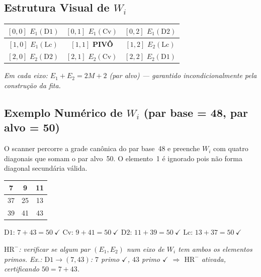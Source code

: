 \documentclass[12pt,a4paper]{article}
\theoremstyle{definition}
\newcommand{\HRm}{\mathrm{HR}^{-}}
\begin{document}
\subsection{Estrutura Visual de \texorpdfstring{$W_i$}{Wi}}
\label{subsec:janela-visual}

\renewcommand{\arraystretch}{1.6}
\begin{center}
\begin{tabular}{|c|c|c|}
	\hline
	$[0,0]$\; $E_1(\mathrm{D1})$ & $[0,1]$\; $E_1(\mathrm{Cv})$ & $[0,2]$\; $E_1(\mathrm{D2})$ \\
	\hline
	$[1,0]$\; $E_1(\mathrm{Lc})$ & $[1,1]$\; \textbf{PIVÔ} & $[1,2]$\; $E_2(\mathrm{Lc})$ \\
	\hline
	$[2,0]$\; $E_2(\mathrm{D2})$ & $[2,1]$\; $E_2(\mathrm{Cv})$ & $[2,2]$\; $E_2(\mathrm{D1})$ \\
	\hline
\end{tabular}
\end{center}

\noindent\textit{Em cada eixo: $E_1 + E_2 = 2M{+}2$ (par alvo) —
garantido incondicionalmente pela construção da fita.}

\subsection{Exemplo Numérico de \texorpdfstring{$W_i$}{Wi} (par base = 48, par alvo = 50)}
\label{subsec:janela-exemplo}

O scanner percorre a grade canônica do par base~48 e preenche $W_i$ com
quatro diagonais que somam o par alvo~50. O elemento~1 é ignorado pois não
forma diagonal secundária válida.

\renewcommand{\arraystretch}{1.6}
\begin{center}
\begin{tabular}{|c|c|c|}
	\hline
	7 & 9 & 11 \\
	\hline
	37 & 25 & 13 \\
	\hline
	39 & 41 & 43 \\
	\hline
\end{tabular}
\end{center}

\noindent
$\mathrm{D1}$: $7 + 43 = 50\ \checkmark$\quad
$\mathrm{Cv}$: $9 + 41 = 50\ \checkmark$\quad
$\mathrm{D2}$: $11 + 39 = 50\ \checkmark$\quad
$\mathrm{Lc}$: $13 + 37 = 50\ \checkmark$

\medskip\noindent
\textit{$\HRm$: verificar se algum par $(E_1, E_2)$ num eixo de $W_i$ tem
ambos os elementos primos. Ex.: $\mathrm{D1} \to (7, 43)$: $7$ primo
$\checkmark$, $43$ primo $\checkmark$ $\Rightarrow$ $\HRm$ ativada,
certificando $50 = 7 + 43$.}
\end{document}
